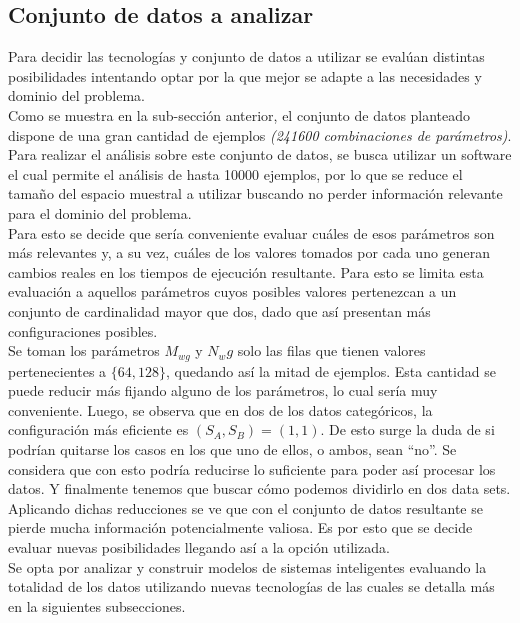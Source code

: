\documentclass[osajnl,twocolumn,showpacs,superscriptaddress,10pt]{revtex4-1} %
\begin{document}
\subsection{Conjunto de datos a analizar}

Para decidir las tecnologías y conjunto de datos a utilizar se evalúan distintas posibilidades intentando optar por la que mejor se adapte a las necesidades y dominio del problema. \\

Como se muestra en la sub-sección anterior, el conjunto de datos planteado dispone de una gran cantidad de ejemplos \textit{(241600 combinaciones de parámetros)}. Para realizar el análisis sobre este conjunto de datos, se busca utilizar un software el cual permite el análisis de hasta 10000 ejemplos, por lo que se reduce el tamaño del espacio muestral a utilizar buscando no perder información relevante para el dominio del problema. \\

Para esto se decide que sería conveniente evaluar cuáles de esos parámetros son más relevantes y, a su vez, cuáles de los valores tomados por cada uno generan cambios reales en los tiempos de ejecución resultante. Para esto se limita esta evaluación a aquellos parámetros cuyos posibles valores pertenezcan a un conjunto de cardinalidad mayor que dos, dado que así presentan más configuraciones posibles. \\

Se toman los parámetros $M_{wg}$ y $N_wg$ solo las filas que tienen valores pertenecientes a $\{64, 128\}$, quedando así la mitad de ejemplos. Esta cantidad se puede reducir más fijando alguno de los parámetros, lo cual sería muy conveniente. Luego, se observa que en dos de los datos categóricos, la configuración más eficiente es $(S_{A}, S_{B}) = (1, 1)$. De esto surge la duda de si podrían quitarse los casos en los que uno de ellos, o ambos, sean “no”. Se considera que con esto podría reducirse lo suficiente para poder así procesar los datos. Y finalmente tenemos que buscar cómo podemos dividirlo en dos data sets. \\

Aplicando dichas reducciones se ve que con el conjunto de datos resultante se pierde mucha información potencialmente valiosa. Es por esto que se decide evaluar nuevas posibilidades llegando así a la opción utilizada. \\

Se opta por analizar y construir modelos de sistemas inteligentes evaluando la totalidad de los datos utilizando nuevas tecnologías de las cuales se detalla más en la siguientes subsecciones. \\
\end{document}
